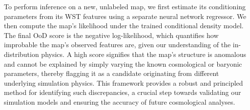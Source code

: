 \documentclass[]{article}
\begin{document}
To perform inference on a new, unlabeled map, we first estimate its conditioning parameters from its WST features using a separate neural network regressor. We then compute the map's likelihood under the trained conditional density model. The final OoD score is the negative log-likelihood, which quantifies how improbable the map's observed features are, given our understanding of the in-distribution physics. A high score signifies that the map's structure is anomalous and cannot be explained by simply varying the known cosmological or baryonic parameters, thereby flagging it as a candidate originating from different underlying simulation physics. This framework provides a robust and principled method for identifying such discrepancies, a crucial step towards validating our simulation models and ensuring the accuracy of future cosmological analyses.
\end{document}

